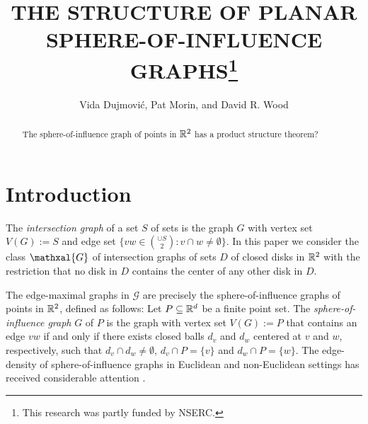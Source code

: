 \documentclass{patmorin}
\title{\MakeUppercase{The Structure of Planar Sphere-of-Influence Graphs}\thanks{This research was partly funded by NSERC.}}
\author{Vida Dujmović, Pat Morin, and David R. Wood}
\date{}
\begin{document}
\maketitle

\begin{abstract}
    The sphere-of-influence graph of points in $\mathbb{R}^2$ has a product structure theorem?

\end{abstract}

\section{Introduction}

The \emph{intersection graph} of a set $S$ of sets is the graph $G$ with vertex set $V(G):=S$ and edge set $\{vw\in\binom{\cup S}{2}: v\cap w\neq\emptyset\}$.  In this paper we consider the class $\mathxal{G}$ of intersection graphs of sets $D$ of closed disks in $\mathbb{R}^2$ with the restriction that no disk in $D$ contains the center of any other disk in $D$.

The edge-maximal graphs in $\mathcal{G}$ are precisely the sphere-of-influence graphs of points in $\mathbb{R}^2$, defined as follows:  Let $P\subseteq\mathbb{R}^d$ be a finite point set.  The \emph{sphere-of-influence graph} $G$ of $P$ is the graph with vertex set $V(G):=P$ that contains an edge $vw$ if and only if there exists closed balls $d_v$ and $d_w$ centered at $v$ and $w$, respectively, such that $d_v\cap d_w\neq \emptyset$, $d_v\cap P=\{v\}$ and $d_w\cap P=\{w\}$.  The edge-density of sphere-of-influence graphs in Euclidean and non-Euclidean settings has received considerable attention  \cite{avis.horton:,michael.quint:sphere,soss:on,ismailescu.kim.ea:improved, dwyer:expected}.




\end{document}
